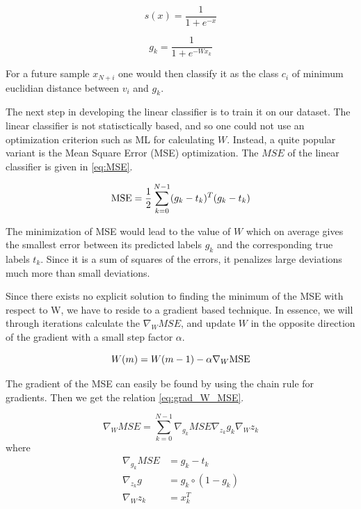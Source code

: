 \documentclass{article}
\begin{document}
\begin{equation}
    s(x) = \frac{1}{1 + e^{-x}} \label{eq:sigmoid}
\end{equation}

\begin{equation}
    g_k = \frac{1}{1 + e^{-Wx_k}} \label{eq:score_function}
\end{equation}

For a future sample $x_{N+i}$ one would then classify it as the class $c_i$ of minimum euclidian
distance between $v_i$ and $g_k$.

The next step in developing the linear classifier is to train it on our dataset.
The linear classifier is not statisctically based, and so one could not use an optimization
criterion such as ML for calculating $W$. Instead, a quite popular variant is the Mean Square
Error (MSE) optimization. The $MSE$ of the linear classifier is given in \eqref{eq:MSE}.

\begin{equation}
    \textnormal{MSE} = \frac{1}{2} \sum_{k=0}^{N-1} (g_k - t_k)^T(g_k - t_k) \label{eq:MSE}
\end{equation}

The minimization of MSE would lead to the value of $W$ which on average gives the smallest error
between its predicted labels $g_k$ and the corresponding true labels $t_k$. Since it is a sum of
squares of the errors, it penalizes large deviations much more than small deviations.

Since there exists no explicit solution to finding the minimum of the MSE with respect to W,
we have to reside to a gradient based technique. In essence, we will through iterations calculate
the $\nabla_W MSE$, and update $W$ in the opposite direction of the gradient with a
small step factor $\alpha$.

\begin{equation}
    W(m) = W(m-1) - \alpha \nabla_W\textnormal{MSE} \label{eq:W_iteration}
\end{equation}

The gradient of the MSE can easily be found by using the chain rule for gradients. Then we get the
relation \eqref{eq:grad_W_MSE}.

\begin{equation}
    \nabla_WMSE = \sum_{k=0}^{N-1} \nabla_{g_k} MSE \nabla_{z_k} g_k \nabla_W z_k \label{eq:grad_W_MSE}
\end{equation}
where
\begin{align*}
    \nabla_{g_{k}} M S E &=g_{k}-t_{k} \\
    \nabla_{z_{k}} g &=g_{k} \circ\left(1-g_{k}\right) \\
    \nabla_{W} z_{k} &=x_{k}^{T}
\end{align*}
\end{document}
